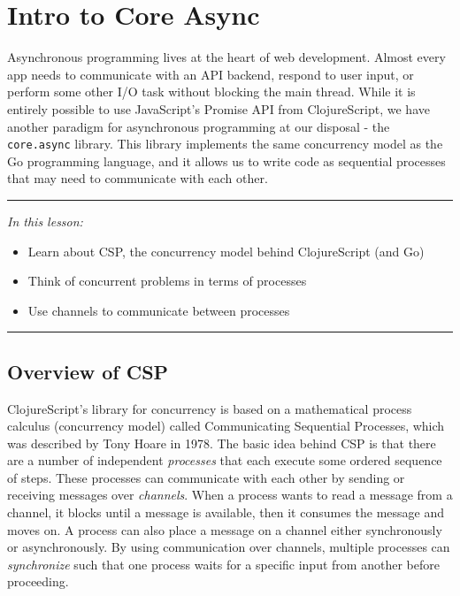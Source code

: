 \documentclass[10pt,twoside,openright]{memoir}
\begin{document}
\chapter{Intro to Core Async}

Asynchronous programming lives at the heart of web development. Almost
every app needs to communicate with an API backend, respond to user
input, or perform some other I/O task without blocking the main thread.
While it is entirely possible to use JavaScript's Promise API from
ClojureScript, we have another paradigm for asynchronous programming at
our disposal - the \texttt{core.async} library. This library implements
the same concurrency model as the Go programming language, and it allows
us to write code as sequential processes that may need to communicate
with each other.

\begin{center}\rule{0.5\linewidth}{0.5pt}\end{center}

\emph{In this lesson:}

\begin{itemize}
\tightlist
\item
  Learn about CSP, the concurrency model behind ClojureScript (and Go)
\item
  Think of concurrent problems in terms of processes
\item
  Use channels to communicate between processes
\end{itemize}

\begin{center}\rule{0.5\linewidth}{0.5pt}\end{center}


\section{Overview of CSP}

ClojureScript's library for concurrency is based on a mathematical
process calculus (concurrency model) called Communicating Sequential
Processes, which was described by Tony Hoare in 1978. The basic idea
behind CSP is that there are a number of independent \emph{processes}
that each execute some ordered sequence of steps. These processes can
communicate with each other by sending or receiving messages over
\emph{channels}. When a process wants to read a message from a channel,
it blocks until a message is available, then it consumes the message and
moves on. A process can also place a message on a channel either
synchronously or asynchronously. By using communication over channels,
multiple processes can \emph{synchronize} such that one process waits
for a specific input from another before proceeding.
\end{document}
